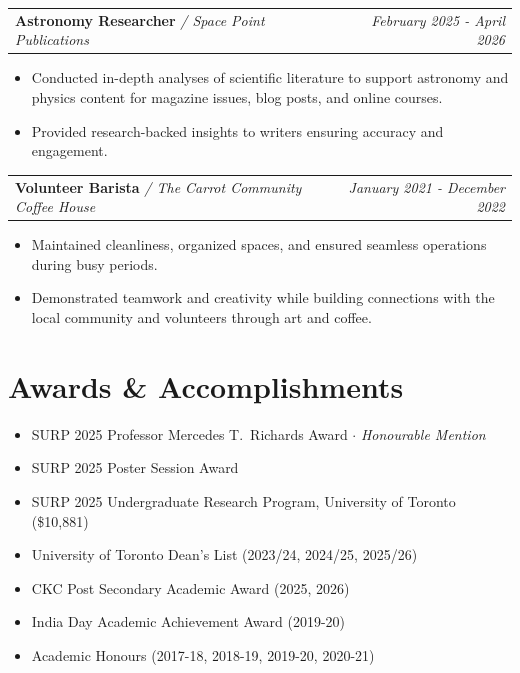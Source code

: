 \documentclass[11pt, letterpaper]{article}
\makeatletter
\newcommand{\cventry}[4]{%
  \noindent
  \begin{tabular*}{\textwidth}{@{}l@{\extracolsep{\fill}}r@{}}
    \textbf{#1} \textit{#2} & \textit{\small #4}
  \end{tabular*}%
  \par\vspace{1pt}%
}
\makeatother
\begin{document}
\vspace{4pt}
\cventry{Astronomy Researcher}{/ Space Point Publications}{}{February 2025 - April 2026}
\begin{itemize}
  \item Conducted in-depth analyses of scientific literature to support astronomy and physics content for magazine issues, blog posts, and online courses.
  \item Provided research-backed insights to writers ensuring accuracy and engagement.
\end{itemize}

\vspace{4pt}
\cventry{Volunteer Barista}{/ The Carrot Community Coffee House}{}{January 2021 - December 2022}
\begin{itemize}
  \item Maintained cleanliness, organized spaces, and ensured seamless operations during busy periods.
  \item Demonstrated teamwork and creativity while building connections with the local community and volunteers through art and coffee.
\end{itemize}


\section{Awards \& Accomplishments}

\begin{itemize}
  \item SURP 2025 Professor Mercedes T.\ Richards Award $\cdot$ \textit{Honourable Mention}
  \item SURP 2025 Poster Session Award
  \item SURP 2025 Undergraduate Research Program, University of Toronto (\$10,881)
  \item University of Toronto Dean's List (2023/24, 2024/25, 2025/26)
  \item CKC Post Secondary Academic Award (2025, 2026)
  \item India Day Academic Achievement Award (2019-20)
  \item Academic Honours (2017-18, 2018-19, 2019-20, 2020-21)
\end{itemize}
\end{document}
